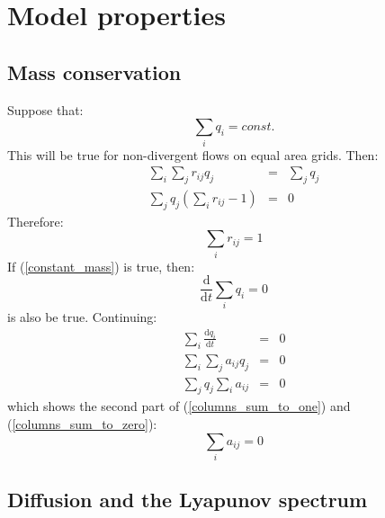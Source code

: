 
\section{Model properties}

\subsection{Mass conservation}

\label{mass_conservation_derivation}

Suppose that:
\begin{equation}
	\sum_i q_i = const.
	\label{constant_mass}
\end{equation}
This will be true for non-divergent flows on equal area grids.
Then:
\begin{eqnarray}
	\sum_i \sum_j r_{ij} q_j & = & \sum_j q_j \\
	\sum_j q_j \left ( \sum_i r_{ij} - 1 \right ) & = & 0
\end{eqnarray}
Therefore:
\begin{equation}
	\sum_i r_{ij} = 1
\end{equation}
If (\ref{constant_mass}) is true, then:
\begin{equation}
	\frac{\mathrm d}{\mathrm d t}\sum_i q_i = 0
\end{equation}
is also be true. Continuing:
\begin{eqnarray}
	\sum_i \frac{\mathrm d q_i}{\mathrm d t} & = & 0 \\
\sum_i \sum_j a_{ij} q_j & = & 0 \\
\sum_j q_j \sum_i a_{ij} & = & 0
\end{eqnarray}
which shows the second part of (\ref{columns_sum_to_one}) and 
(\ref{columns_sum_to_zero}):
\begin{equation}
	\sum_i a_{ij} = 0
\end{equation}

\subsection{Diffusion and the Lyapunov spectrum}

\label{Lyapunov_exponents_less_than_zero}


